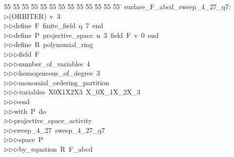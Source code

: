 %
%
\begin{tabbing}
55 \= 55 \= 55 \= 55 \= 55 \= 55 \= 55 \= 55 \= 55 \= 55 \= 55 \= 55 \= 55 \= \kill
surface\_F\_abcd\_sweep\_4\_27\_q7:\\[0pt]
$\triangleright$\>(ORBITER)\ v\ 3\ \\[0pt]
$\triangleright$\>$\triangleright$\>define\ F\ finite\_field\ q\ 7\ end\ \\[0pt]
$\triangleright$\>$\triangleright$\>define\ P\ projective\_space\ n\ 3\ field\ F\ v\ 0\ end\ \\[0pt]
$\triangleright$\>$\triangleright$\>define\ R\ polynomial\_ring\ \\[0pt]
$\triangleright$\>$\triangleright$\>$\triangleright$\>field\ F\ \\[0pt]
$\triangleright$\>$\triangleright$\>$\triangleright$\>number\_of\_variables\ 4\ \\[0pt]
$\triangleright$\>$\triangleright$\>$\triangleright$\>homogeneous\_of\_degree\ 3\ \\[0pt]
$\triangleright$\>$\triangleright$\>$\triangleright$\>monomial\_ordering\_partition\ \\[0pt]
$\triangleright$\>$\triangleright$\>$\triangleright$\>variables\ X0X1X2X3\ X\_0X\_1X\_2X\_3\ \\[0pt]
$\triangleright$\>$\triangleright$\>$\triangleright$\>end\ \\[0pt]
$\triangleright$\>$\triangleright$\>with\ P\ do\ \\[0pt]
$\triangleright$\>$\triangleright$\>projective\_space\_activity\ \\[0pt]
$\triangleright$\>$\triangleright$\>sweep\_4\_27\ sweep\_4\_27\_q7\ \\[0pt]
$\triangleright$\>$\triangleright$\>$\triangleright$\>space\ P\ \\[0pt]
$\triangleright$\>$\triangleright$\>$\triangleright$\>by\_equation\ R\ F\_abcd\ \\[0pt]

\end{tabbing}
